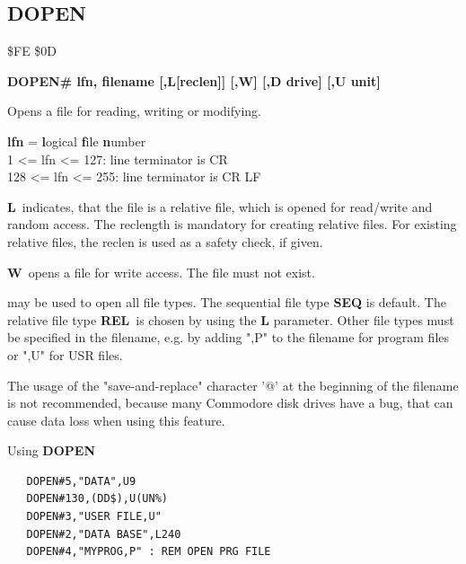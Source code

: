 \subsection{DOPEN}
\begin{description}[leftmargin=2cm,style=nextline]
\item [Token:] \$FE \$0D
\item [Format:]
  {\bf DOPEN\# lfn, filename [,L[reclen]] [,W] [,D drive] [,U unit] }
\item [Usage:]
   Opens a file for reading, writing or
   modifying.

   {\bf lfn} = {\bf l}ogical {\bf f}ile {\bf n}umber \\
   1 <= lfn <= 127: line terminator is CR \\
   128 <= lfn <= 255: line terminator is CR LF

   {\bf L} indicates, that the file is a relative file, which
   is opened for read/write and random access. The reclength
   is mandatory for creating relative files. For existing
   relative files, the reclen is used as a safety check, if given.

   {\bf W} opens a file for write access. The file must not exist.

   \filenamedefinition

   \drivedefinition

   \unitdefinition

\item [Remarks:]
    may be used to open all file types.
   The sequential file type {\bf SEQ} is default.
   The relative file type {\bf REL} is chosen by using the
   {\bf L} parameter.  Other file types
   must be specified in the filename, e.g. by adding ",P" to the
   filename for program files or ",U" for USR files.

   The usage of the "save-and-replace" character '@' at the
   beginning of the filename is not recommended, because many
   Commodore disk drives have a bug, that can cause data loss
   when using this feature.

\newpage
\item [Example:] Using {\bf DOPEN}

\begin{tcolorbox}[colback=black,coltext=white]
\verbatimfont{\codefont}
\begin{verbatim}
   DOPEN#5,"DATA",U9
   DOPEN#130,(DD$),U(UN%)
   DOPEN#3,"USER FILE,U"
   DOPEN#2,"DATA BASE",L240
   DOPEN#4,"MYPROG,P" : REM OPEN PRG FILE
\end{verbatim}
\end{tcolorbox}
\end{description}


